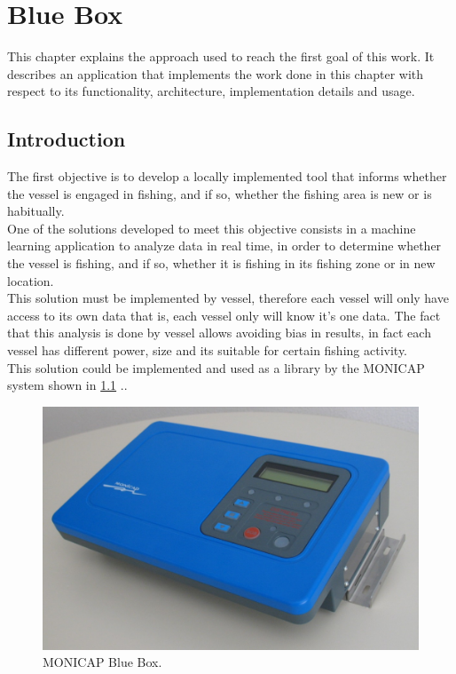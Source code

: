 % 
%  
%
\chapter{Blue Box}
\label{cha:blue_box}
This chapter explains the approach used to reach the first goal of this work. It describes an application that implements the work done in this chapter with respect to its functionality, architecture, implementation details and usage.  

\section{Introduction} %
\label{sec:introduction}
The first objective is to develop a locally implemented tool that informs whether the vessel is engaged in fishing, and if so, whether the fishing area is new or is habitually.\\
One of the solutions developed to meet this objective consists in a machine learning application to analyze data in real time, in order to determine whether the vessel is fishing, and if so, whether it is fishing in its fishing zone or in new location.\\
This solution must be implemented by vessel, therefore each vessel will only have access to its own data that is, each vessel only will know it’s one data.
The fact that this analysis is done by vessel allows avoiding bias in results, in fact each vessel has different power, size and its suitable for certain fishing activity.\\
This solution could be implemented and used as a library by the MONICAP system shown in \ref{fig:monicap} .\cite{WEBSITE:MonicapXsealence}.

\begin{figure}[H]
    \centering
    \includegraphics[width=0.8\linewidth]{Chapters/img/equipamento_monicap.png}
    \caption{MONICAP Blue Box.}
    \label{fig:monicap}
\end{figure}


